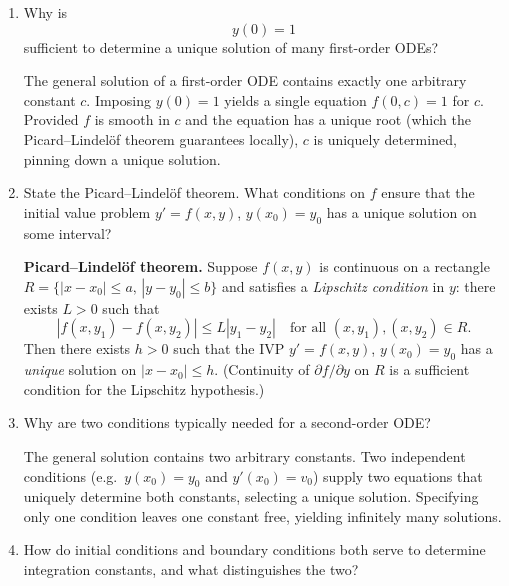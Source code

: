 \documentclass{self-check}
\begin{document}
\begin{enumerate}[leftmargin=*, itemsep=8pt]
    \begin{answer}
      An initial condition \(y(x_{0})=y_{0}\) requires the solution curve to pass through the specific point \((x_{0},y_{0})\). Substituting into the general solution \(y=f(x,c)\) gives one equation for \(c\), which (under Picard--Lindelöf conditions) has a unique solution, singling out one member of the family.
    \end{answer}
  \item Why is
    \[ y(0)=1 \]
    sufficient to determine a unique solution of many first-order ODEs?

    \begin{answer}
      The general solution of a first-order ODE contains exactly one arbitrary constant \(c\). Imposing \(y(0)=1\) yields a single equation \(f(0,c)=1\) for \(c\). Provided \(f\) is smooth in \(c\) and the equation has a unique root (which the Picard--Lindelöf theorem guarantees locally), \(c\) is uniquely determined, pinning down a unique solution.
    \end{answer}
  \item State the Picard--Lindel\"of theorem. What conditions on \(f\) ensure that the initial value problem \(y'=f(x,y)\), \(y(x_{0})=y_{0}\) has a unique solution on some interval?

    \begin{answer}
      \textbf{Picard--Lindelöf theorem.} Suppose \(f(x,y)\) is continuous on a rectangle \(R=\{|x-x_{0}|\le a,\,|y-y_{0}|\le b\}\) and satisfies a \emph{Lipschitz condition} in \(y\): there exists \(L>0\) such that
      \[ |f(x,y_{1})-f(x,y_{2})| \le L|y_{1}-y_{2}| \quad \text{for all }(x,y_{1}),(x,y_{2})\in R. \]
      Then there exists \(h>0\) such that the IVP \(y'=f(x,y)\), \(y(x_{0})=y_{0}\) has a \emph{unique} solution on \(|x-x_{0}|\le h\). (Continuity of \(\partial f/\partial y\) on \(R\) is a sufficient condition for the Lipschitz hypothesis.)
    \end{answer}
  \item Why are two conditions typically needed for a second-order ODE?

    \begin{answer}
      The general solution contains two arbitrary constants. Two independent conditions (e.g.\ \(y(x_{0})=y_{0}\) and \(y'(x_{0})=v_{0}\)) supply two equations that uniquely determine both constants, selecting a unique solution. Specifying only one condition leaves one constant free, yielding infinitely many solutions.
    \end{answer}
  \item How do initial conditions and boundary conditions both serve to determine integration constants, and what distinguishes the two?


\end{enumerate}
\end{document}
